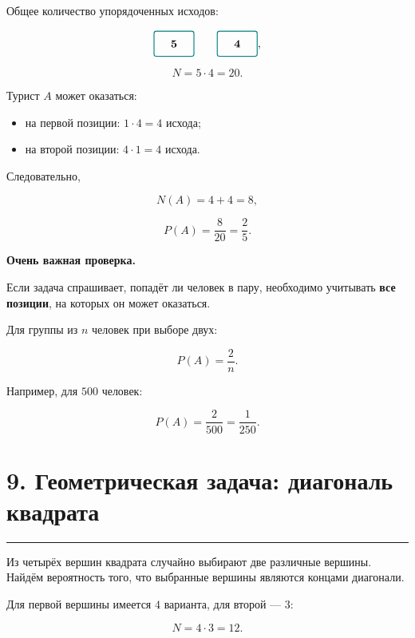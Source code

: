 \documentclass[a4paper,12pt]{article}
\newcommand{\sectionline}{%
    \vspace{0.2em}
    {\color{accent}\rule{\linewidth}{0.7pt}}
    \vspace{0.4em}
}
\newcommand{\positionbox}[1]{%
    \tikz[baseline=-0.7ex]\node[
        draw=accent,
        rounded corners=2pt,
        minimum width=1.25cm,
        minimum height=0.8cm,
        line width=0.8pt
    ]{\textbf{#1}};%
}
\newcommand{\important}[1]{%
    \par\smallskip
    {\color{darkaccent}\textbf{#1}}
    \par\smallskip
}
\begin{document}
Общее количество упорядоченных исходов:

\[
\positionbox{5}
\qquad
\positionbox{4},
\]

\[
N=5\cdot4=20.
\]

Турист \(A\) может оказаться:

\begin{itemize}[leftmargin=1.5em]
    \item на первой позиции: \(1\cdot4=4\) исхода;
    \item на второй позиции: \(4\cdot1=4\) исхода.
\end{itemize}

Следовательно,

\[
N(A)=4+4=8,
\]

\[
\boxed{
P(A)=\frac8{20}=\frac25
}.
\]

\important{Очень важная проверка.}
Если задача спрашивает, попадёт ли человек в пару, необходимо учитывать \textbf{все позиции}, на которых он может оказаться.

Для группы из \(n\) человек при выборе двух:

\[
P(A)=\frac{2}{n}.
\]

Например, для \(500\) человек:

\[
\boxed{
P(A)=\frac2{500}=\frac1{250}
}.
\]

\newpage

\section*{9. Геометрическая задача: диагональ квадрата}
\sectionline

Из четырёх вершин квадрата случайно выбирают две различные вершины. Найдём вероятность того, что выбранные вершины являются концами диагонали.

\begin{center}
\end{center}

Для первой вершины имеется \(4\) варианта, для второй --- \(3\):

\[
N=4\cdot3=12.
\]
\end{document}
